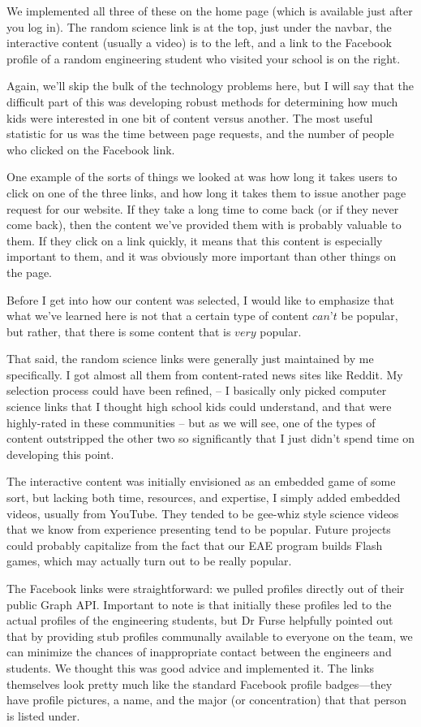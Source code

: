 \documentclass[11pt,a4paper]{article}
\begin{document}
We implemented all three of these on the home page (which is available just after you log in).  The random science link is at the top, just under the navbar, the interactive content (usually a video) is to the left, and a link to the Facebook profile of a random engineering student who visited your school is on the right.

Again, we'll skip the bulk of the technology problems here, but I will say that the difficult part of this was developing robust methods for determining how much kids were interested in one bit of content versus another. The most useful statistic for us was the time between page requests, and the number of people who clicked on the Facebook link.

One example of the sorts of things we looked at was how long it takes users to click on one of the three links, and how long it takes them to issue another page request for our website. If they take a long time to come back (or if they never come back), then the content we've provided them with is probably valuable to them. If they click on a link quickly, it means that this content is especially important to them, and it was obviously more important than other things on the page.

Before I get into how our content was selected, I would like to emphasize that what we've learned here is not that a certain type of content $\textit{can't}$ be popular, but rather, that there is some content that is $\textit{very}$ popular.

That said, the random science links were generally just maintained by me specifically. I got almost all them from content-rated news sites like Reddit. My selection process could have been refined, -- I basically only picked computer science links that I thought high school kids could understand, and that were highly-rated in these communities -- but as we will see, one of the types of content outstripped the other two so significantly that I just didn't spend time on developing this point.

The interactive content was initially envisioned as an embedded game of some sort, but lacking both time, resources, and expertise, I simply added embedded videos, usually from YouTube. They tended to be gee-whiz style science videos that we know from experience presenting tend to be popular. Future projects could probably capitalize from the fact that our EAE program builds Flash games, which may actually turn out to be really popular.

The Facebook links were straightforward: we pulled profiles directly out of their public Graph API. Important to note is that initially these profiles led to the actual profiles of the engineering students, but Dr Furse helpfully pointed out that by providing stub profiles communally available to everyone on the team, we can minimize the chances of inappropriate contact between the engineers and students. We thought this was good advice and implemented it. The links themselves look pretty much like the standard Facebook profile badges---they have profile pictures, a name, and the major (or concentration) that that person is listed under.
\end{document}
